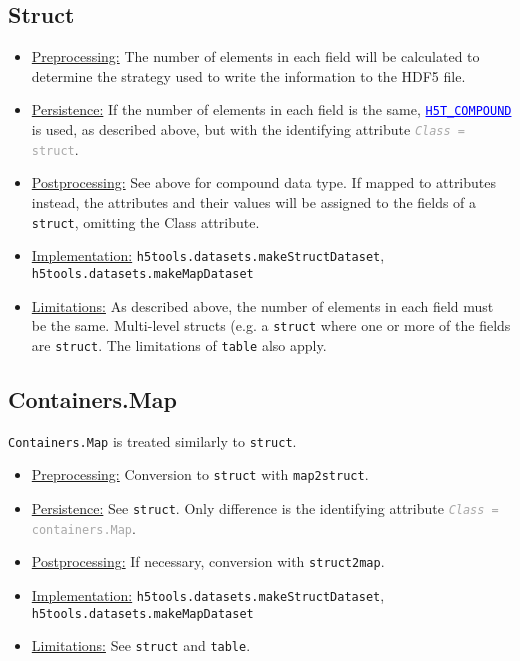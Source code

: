 \documentclass[11pt]{exam}
\newcommand\myurl[1]{\textcolor{blue}{\underline{#1}}}
\newcommand\myfcn[1]{\colorbox{codegray}{\textcolor{codeblue}{\texttt{#1}}}}
\newcommand\hdftype[1]{\texttt{\myurl{#1}}}
\newcommand\myatt[2]{\textcolor{darkgray}{\texttt{\textit{#1} = #2}}}
\begin{document}
        \subsection{Struct}
        \noindent\begin{itemize}
            \item \underline{Preprocessing:} The number of elements in each field will be calculated to determine the strategy used to write the information to the HDF5 file. 
            \item \underline{Persistence:} If the number of elements in each field is the same, \hdftype{H5T\_COMPOUND} is used, as described above, but with the identifying attribute \myatt{Class}{struct}. 
            \item \underline{Postprocessing:} See above for compound data type. If mapped to attributes instead, the attributes and their values will be assigned to the fields of a \texttt{struct}, omitting the Class attribute. 
            \item \underline{Implementation:} \myfcn{h5tools.datasets.makeStructDataset}, \myfcn{h5tools.datasets.makeMapDataset}
            \item \underline{Limitations:} As described above, the number of elements in each field must be the same. Multi-level structs (e.g. a \texttt{struct} where one or more of the fields are \texttt{struct}. The limitations of \texttt{table} also apply.
        \end{itemize}
	
        \subsection{Containers.Map}
        \noindent \texttt{Containers.Map} is treated similarly to \texttt{struct}.
        \noindent\begin{itemize}
            \item \underline{Preprocessing:} Conversion to \texttt{struct} with \myfcn{map2struct}.
            \item \underline{Persistence:} See \texttt{struct}. Only difference is the identifying attribute \myatt{Class}{containers.Map}. 
            \item \underline{Postprocessing:} If necessary, conversion with \myfcn{struct2map}. 
            \item \underline{Implementation:} \myfcn{h5tools.datasets.makeStructDataset}, \myfcn{h5tools.datasets.makeMapDataset}
            \item \underline{Limitations:} See \texttt{struct} and \texttt{table}.
        \end{itemize}
\end{document}
